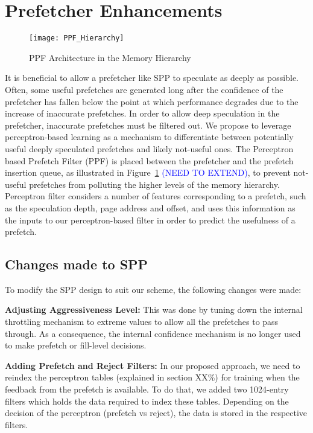 \section{Prefetcher Enhancements}
\label{Enhancements}

\begin{figure}
  \begin{center}
  \texttt{[image: PPF\_Hierarchy]}
  \caption{PPF Architecture in the Memory Hierarchy}
  \label{fig:PPF_Hierarchy}
  \end{center}
\end{figure}

It is beneficial to allow a prefetcher like SPP to speculate as 
deeply as possible. Often, some useful prefetches are generated long 
after the confidence of the prefetcher has fallen below the point at 
which performance degrades due to the increase of inaccurate prefetches.  
In order to allow deep speculation in the prefetcher, inaccurate
prefetches must be filtered out. We propose to leverage
perceptron-based learning as a mechanism to differentiate between
potentially useful deeply speculated prefetches and likely not-useful
ones. The Perceptron based Prefetch Filter (PPF) is placed between the
prefetcher and the prefetch insertion queue, as illustrated in
Figure~\ref{fig:PPF_Hierarchy} \textcolor{blue}{(NEED TO EXTEND)}, 
to prevent not-useful prefetches from polluting the higher levels 
of the memory hierarchy. Perceptron filter considers a number of 
features corresponding to a prefetch, such as the speculation depth, 
page address and offset, and uses this information as the inputs to our 
perceptron-based filter in order to predict the usefulness of a prefetch.  

\subsection{Changes made to SPP}
\label{Enhancements-SPP}
To modify the SPP design to suit our scheme, the following changes
were made:

\noindent \textbf{Adjusting Aggressiveness Level:}
This was done by tuning down the internal throttling mechanism to 
extreme values to allow all the prefetches to pass through. As a 
consequence, the internal confidence mechanism is no longer used
to make prefetch or fill-level decisions.

\noindent \textbf{Adding Prefetch and Reject Filters:}
In our proposed approach, we need to reindex the perceptron tables (explained in
section XX\%) for training when the feedback from the prefetch is available.
To do that, we added two 1024-entry filters which holds the data required to index
these tables. Depending on the decision of the perceptron (prefetch vs reject), the
data is stored in the respective filters.


